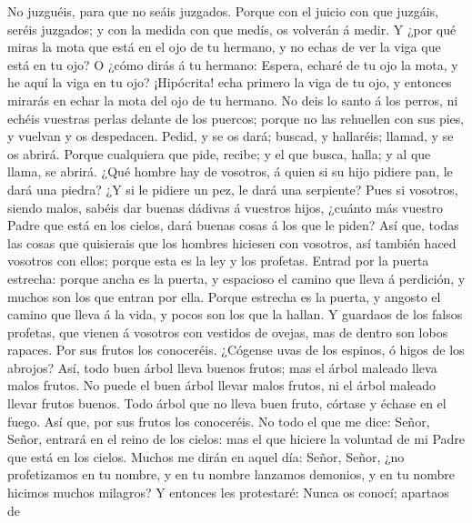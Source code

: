  No juzguéis, para que no seáis juzgados. 
Porque con el juicio con que juzgáis, seréis juzgados; y con la medida
con que medís, os volverán á medir.  Y ¿por qué miras la
mota que está en el ojo de tu hermano, y no echas de ver la viga que
está en tu ojo?  O ¿cómo dirás á tu hermano: Espera,
echaré de tu ojo la mota, y he aquí la viga en tu ojo? 
¡Hipócrita! echa primero la viga de tu ojo, y entonces mirarás en echar
la mota del ojo de tu hermano.  No deis lo santo á los
perros, ni echéis vuestras perlas delante de los puercos; porque no las
rehuellen con sus pies, y vuelvan y os despedacen.  Pedid,
y se os dará; buscad, y hallaréis; llamad, y se os abrirá.
 Porque cualquiera que pide, recibe; y el que busca,
halla; y al que llama, se abrirá.  ¿Qué hombre hay de
vosotros, á quien si su hijo pidiere pan, le dará una piedra?
 ¿Y si le pidiere un pez, le dará una serpiente?
 Pues si vosotros, siendo malos, sabéis dar buenas
dádivas á vuestros hijos, ¿cuánto más vuestro Padre que está en los
cielos, dará buenas cosas á los que le piden?  Así que,
todas las cosas que quisierais que los hombres hiciesen con vosotros,
así también haced vosotros con ellos; porque esta es la ley y los
profetas.  Entrad por la puerta estrecha: porque ancha es
la puerta, y espacioso el camino que lleva á perdición, y muchos son los
que entran por ella.  Porque estrecha es la puerta, y
angosto el camino que lleva á la vida, y pocos son los que la hallan.
 Y guardaos de los falsos profetas, que vienen á vosotros
con vestidos de ovejas, mas de dentro son lobos rapaces. 
Por sus frutos los conoceréis. ¿Cógense uvas de los espinos, ó higos de
los abrojos?  Así, todo buen árbol lleva buenos frutos;
mas el árbol maleado lleva malos frutos.  No puede el
buen árbol llevar malos frutos, ni el árbol maleado llevar frutos
buenos.  Todo árbol que no lleva buen fruto, córtase y
échase en el fuego.  Así que, por sus frutos los
conoceréis.  No todo el que me dice: Señor, Señor,
entrará en el reino de los cielos: mas el que hiciere la voluntad de mi
Padre que está en los cielos.  Muchos me dirán en aquel
día: Señor, Señor, ¿no profetizamos en tu nombre, y en tu nombre
lanzamos demonios, y en tu nombre hicimos muchos milagros?
 Y entonces les protestaré: Nunca os conocí; apartaos de
